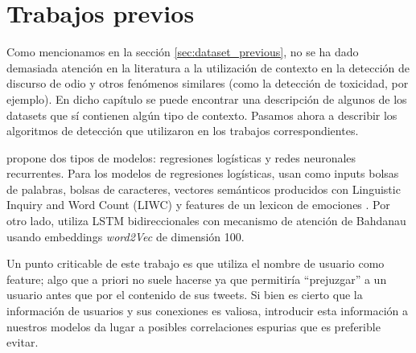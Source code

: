 \section{Trabajos previos}
\label{sec:06_classification_previous}

Como mencionamos en la sección \ref{sec:dataset_previous}, no se ha dado demasiada atención en la literatura a la utilización de contexto en la detección de discurso de odio y otros fenómenos similares (como la detección de toxicidad, por ejemplo). En dicho capítulo se puede encontrar una descripción de algunos de los datasets que sí contienen algún tipo de contexto. Pasamos ahora a describir los algoritmos de detección que utilizaron en los trabajos correspondientes.

\citet{gao-huang-2017-detecting} propone dos tipos de modelos: regresiones logísticas y redes neuronales recurrentes. Para los modelos de regresiones logísticas, usan como inputs bolsas de palabras, bolsas de caracteres, vectores semánticos producidos con Linguistic Inquiry and Word Count (LIWC) \cite{pennebaker2001linguistic} y features de un lexicon de emociones \cite{mohammad2013nrc}. Por otro lado, utiliza LSTM bidireccionales con mecanismo de atención de Bahdanau \cite{bahdanau2014neural} usando embeddings \emph{word2Vec} de dimensión 100.

Un punto criticable de este trabajo es que utiliza el nombre de usuario como feature; algo que a priori no suele hacerse ya que permitiría ``prejuzgar'' a un usuario antes que por el contenido de sus tweets. Si bien es cierto que la información de usuarios y sus conexiones es valiosa, introducir esta información a nuestros modelos da lugar a posibles correlaciones espurias que es preferible evitar.



